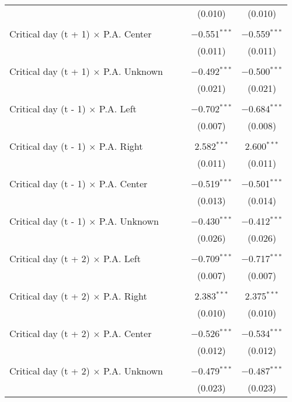 \documentclass[
]{article}
\begin{document}
\begin{table}[!htbp]
{\begin{tabular}{@{\extracolsep{5pt}}lcccc}
  &  &  & (0.010) & (0.010) \\ 
  & & & & \\ 
 Critical day (t + 1) $\times$ P.A. Center &  &  & $-$0.551$^{***}$ & $-$0.559$^{***}$ \\ 
  &  &  & (0.011) & (0.011) \\ 
  & & & & \\ 
 Critical day (t + 1) $\times$ P.A. Unknown &  &  & $-$0.492$^{***}$ & $-$0.500$^{***}$ \\ 
  &  &  & (0.021) & (0.021) \\ 
  & & & & \\ 
 Critical day (t - 1) $\times$ P.A. Left &  &  & $-$0.702$^{***}$ & $-$0.684$^{***}$ \\ 
  &  &  & (0.007) & (0.008) \\ 
  & & & & \\ 
 Critical day (t - 1) $\times$ P.A. Right &  &  & 2.582$^{***}$ & 2.600$^{***}$ \\ 
  &  &  & (0.011) & (0.011) \\ 
  & & & & \\ 
 Critical day (t - 1) $\times$ P.A. Center &  &  & $-$0.519$^{***}$ & $-$0.501$^{***}$ \\ 
  &  &  & (0.013) & (0.014) \\ 
  & & & & \\ 
 Critical day (t - 1) $\times$ P.A. Unknown &  &  & $-$0.430$^{***}$ & $-$0.412$^{***}$ \\ 
  &  &  & (0.026) & (0.026) \\ 
  & & & & \\ 
 Critical day (t + 2) $\times$ P.A. Left &  &  & $-$0.709$^{***}$ & $-$0.717$^{***}$ \\ 
  &  &  & (0.007) & (0.007) \\ 
  & & & & \\ 
 Critical day (t + 2) $\times$ P.A. Right &  &  & 2.383$^{***}$ & 2.375$^{***}$ \\ 
  &  &  & (0.010) & (0.010) \\ 
  & & & & \\ 
 Critical day (t + 2) $\times$ P.A. Center &  &  & $-$0.526$^{***}$ & $-$0.534$^{***}$ \\ 
  &  &  & (0.012) & (0.012) \\ 
  & & & & \\ 
 Critical day (t + 2) $\times$ P.A. Unknown &  &  & $-$0.479$^{***}$ & $-$0.487$^{***}$ \\ 
  &  &  & (0.023) & (0.023) \\ 

\end{tabular}}
\end{table}
\end{document}
